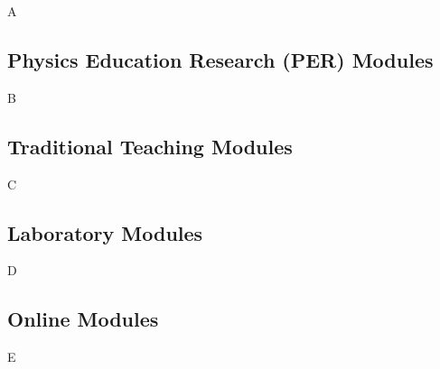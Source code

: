 \documentclass[../../../main.tex]{subfiles}
\begin{document}
A

\subsection{Physics Education Research (PER) Modules}

B

\subsection{Traditional Teaching Modules}

C

\subsection{Laboratory Modules}

D

\subsection{Online Modules}

E
\end{document}
